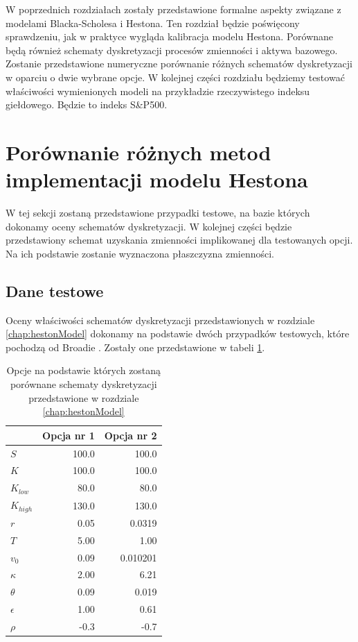 \documentclass{pracamgr}
\begin{document}
W poprzednich rozdziałach zostały przedstawione formalne aspekty związane z modelami 
Blacka-Scholesa i Hestona.
Ten rozdział będzie poświęcony sprawdzeniu, jak w praktyce wygląda kalibracja modelu Hestona.
Porównane będą również schematy dyskretyzacji procesów zmienności i aktywa bazowego.
Zostanie przedstawione numeryczne porównanie różnych schematów dyskretyzacji w oparciu
o dwie wybrane opcje.
W kolejnej części rozdziału będziemy testować właściwości wymienionych modeli na przykładzie 
rzeczywistego indeksu giełdowego.
Będzie to indeks S\&P500. 



\section{Porównanie różnych metod implementacji modelu Hestona}
W tej sekcji zostaną przedstawione przypadki testowe, na bazie których dokonamy
oceny schematów dyskretyzacji. W kolejnej części będzie przedstawiony schemat 
uzyskania zmienności implikowanej dla testowanych opcji. Na ich podstawie zostanie
wyznaczona płaszczyzna zmienności. 

\subsection{Dane testowe}
Oceny właściwości schematów dyskretyzacji przedstawionych w rozdziale \ref{chap:hestonModel}
dokonamy na podstawie dwóch przypadków testowych, które pochodzą od 
Broadie \cite{Broadie}.
Zostały one przedstawione w tabeli \ref{tab:testOptionsComparison}.

\begin{table}[htbp]
\centering
\begin{tabular}{l r r}
\toprule
{} & Opcja nr 1 & Opcja nr 2  \\
\midrule
  $S$         & 100.0 & 100.0 \\
  $K$         & 100.0 & 100.0 \\
  $K_{low}$   & 80.0 & 80.0 \\
  $K_{high}$  & 130.0 & 130.0 \\
  $r$         & 0.05 & 0.0319 \\
  $T$         & 5.00 & 1.00 \\
  $v_0$         & 0.09 & 0.010201 \\
  $\kappa$    & 2.00 & 6.21 \\
  $\theta$    & 0.09 & 0.019 \\
  $\epsilon$  & 1.00 & 0.61 \\
  $\rho$      & -0.3 & -0.7 \\
\bottomrule
\end{tabular}
\caption{Opcje na podstawie których zostaną porównane schematy dyskretyzacji przedstawione
w rozdziale \ref{chap:hestonModel} \cite{Broadie}}
\label{tab:testOptionsComparison}
\end{table}
\end{document}
